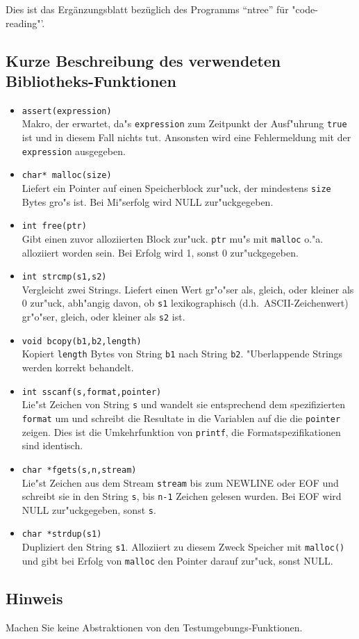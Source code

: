 
Dies ist das Erg\"anzungsblatt bez\"uglich des Programms "`ntree"'
f\"ur "code-reading"'.

\subsection*{Kurze Beschreibung des verwendeten Bibliotheks-Funktionen}

\begin{itemize}
	\item {\tt assert(expression)}\\
		Makro, der erwartet, da"s {\tt expression} zum Zeitpunkt der Ausf"uhrung
		{\tt true} ist und in diesem Fall nichts tut. Ansonsten wird eine 
		Fehlermeldung mit der {\tt expression} ausgegeben.
	\item {\tt char* malloc(size)}\\
		Liefert ein Pointer auf einen Speicherblock zur"uck, der mindestens 
		{\tt size}
		Bytes gro"s ist. Bei Mi"serfolg wird NULL zur"uckgegeben.
	\item {\tt int free(ptr)}\\
		Gibt einen zuvor alloziierten Block zur"uck. {\tt ptr} mu"s mit 
		{\tt malloc} o."a. alloziiert worden sein. Bei Erfolg wird 1, sonst
 		0 zur"uckgegeben.
	\item {\tt int strcmp(s1,s2)}\\
		Vergleicht zwei Strings. Liefert einen Wert gr"o"ser als, gleich, oder
		kleiner als 0 zur"uck, abh"angig davon, ob {\tt s1} lexikographisch
		(d.h.~ASCII-Zeichenwert) gr"o"ser, gleich, oder 
		kleiner als {\tt s2} ist.	
	\item {\tt void bcopy(b1,b2,length)}\\
		Kopiert {\tt length} Bytes von String {\tt b1} nach String {\tt b2}. 
		"Uberlappende Strings werden korrekt behandelt.
	\item {\tt int sscanf(s,format,pointer)}\\
		Lie"st Zeichen von String {\tt s} und wandelt sie entsprechend dem
		spezifizierten {\tt format} um und schreibt die Resultate in die Variablen
		auf die die {\tt pointer} zeigen. Dies ist die Umkehrfunktion 
		von {\tt printf}, die Formatspezifikationen sind identisch. 
	\item {\tt char *fgets(s,n,stream)}\\
		Lie"st Zeichen aus dem Stream {\tt stream} bis zum NEWLINE oder EOF und
		schreibt sie in den String {\tt s}, bis {\tt n-1} Zeichen gelesen wurden.
		Bei EOF wird NULL zur"uckgegeben, sonst {\tt s}.
	\item {\tt char *strdup(s1)}\\
		Dupliziert den String {\tt s1}. Alloziiert zu diesem Zweck Speicher
		mit {\tt malloc()} und gibt bei Erfolg von {\tt malloc} den 
		Pointer darauf zur"uck, sonst NULL.
\end{itemize}

\subsection*{Hinweis}

Machen Sie keine Abstraktionen von den Testumgebungs-Funktionen.

